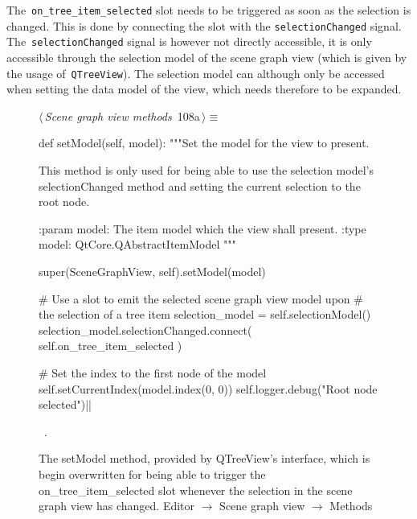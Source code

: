 \documentclass[%
    a4paper,    %
    justified,  %
    nobib,      %
    openany     %
]{tufte-book}
\makeatletter
\renewcommand{\label}[1]{\@tufte@label{##1}}%
\makeatother
\begin{document}
The~\verb=on_tree_item_selected= slot needs to be triggered as soon as the
selection is changed. This is done by connecting the slot with the
\verb=selectionChanged= signal. The~\verb=selectionChanged= signal is however
not directly accessible, it is only accessible through the selection model of
the scene graph view (which is given by the usage of~\verb=QTreeView=). The
selection model can although only be accessed when setting the data model of the
view, which needs therefore to be expanded.

\begin{figure}[!htbp]
\begin{flushleft} \small
\begin{minipage}{\linewidth}\label{scrap43}\raggedright\small
{} $\langle\,${\itshape Scene graph view methods}\nobreak\ {\footnotesize {108a}}$\,\rangle\equiv$
\vspace{-1ex}
\begin{pythoncode}
def setModel(self, model):
    """Set the model for the view to present.

    This method is only used for being able to use the selection
    model's selectionChanged method and setting the current
    selection to the root node.

    :param model: The item model which the view shall present.
    :type  model: QtCore.QAbstractItemModel
    """

    super(SceneGraphView, self).setModel(model)

    # Use a slot to emit the selected scene graph view model upon
    # the selection of a tree item
    selection_model = self.selectionModel()
    selection_model.selectionChanged.connect(
        self.on_tree_item_selected
    )

    # Set the index to the first node of the model
    self.setCurrentIndex(model.index(0, 0))
    self.logger.debug("Root node selected")|\NWsep|
\end{pythoncode}
\vspace{1.5ex}
\footnotesize
\begin{list}{}{\setlength{\itemsep}{-\parsep}\setlength{\itemindent}{-\leftmargin}}
\item \NWtxtMacroRefIn\ .

\item{}
\end{list}
\end{minipage}\vspace{4ex}
\end{flushleft}
\caption{The setModel method, provided by QTreeView's interface, which is begin
  overwritten for being able to trigger the on\_tree\_item\_selected slot
  whenever the selection in the scene graph view has changed.
  \newline{}\newline{}Editor $\rightarrow$ Scene graph view
  $\rightarrow$ Methods}
\end{figure}
\end{document}
